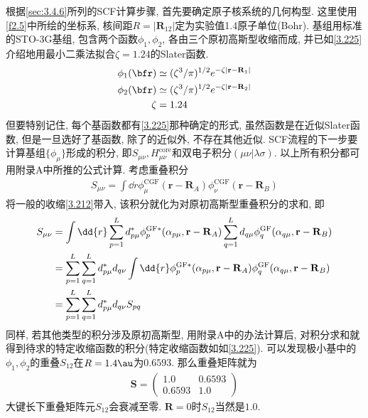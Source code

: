 根据\autoref{sec:3.4.6}所列的SCF计算步骤, 
首先要确定原子核系统的几何构型. 
这里使用\autoref{f2.5}中所绘的坐标系, 
核间距$R=|\mathbf{R}_{12}|$定为实验值1.4原子单位(Bohr). 
基组用标准的STO-3G基组, 
包含两个函数$\phi_1,\phi_2$, 
各由三个原初高斯型收缩而成, 
并已如\autoref{3.225}介绍地用最小二乘法拟合$\zeta=1.24$的Slater函数. 
\begin{equation}
	\begin{split}
		\phi_1(\bfr) & \simeq (\zeta^3/\pi)^{1/2}e^{-\zeta|\mathbf{r-R}_1|}\\
		\phi_2(\bfr) & \simeq (\zeta^3/\pi)^{1/2}e^{-\zeta|\mathbf{r-R}_2|}\\
		\zeta & = 1.24
	\end{split}
\end{equation}
但要特别记住,
每个基函数都有\autoref{3.225}那种确定的形式, 
虽然函数是在近似Slater函数, 
但是一旦选好了基函数, 
除了\hft 的近似外, 
不存在其他近似. 
SCF流程的下一步要计算基组$\{\phi_\mu\}$形成的积分, 
即$S_{\mu\nu}, H_{\mu\nu}^\mathrm{core}$和双电子积分$(\mu\nu|\lambda\sigma)$. 
以上所有积分都可用附录A中所推的公式计算. 
考虑重叠积分
\begin{align}
	S_{\mu\nu} = \int\dd{r}\phi_\mu^\mathrm{CGF}(\mathbf{r-R}_A)\phi_\nu^\mathrm{CGF}(\mathbf{r-R}_B)
\end{align}
将一般的收缩\autoref{3.212}带入, 
该积分就化为对原初高斯型重叠积分的求和,
即
\begin{align}
	S_{\mu\nu} & = \int\dd{r}\sum_{p=1}^{L}d_{p\mu}^*\phi_p^\mathrm{GF*}(\alpha_{p\mu},\mathbf{r-R}_A)\sum_{q=1}^{L}d_{q\mu}\phi_q^\mathrm{GF}(\alpha_{q\mu},\mathbf{r-R}_B)\notag\\
	& = \sum_{p=1}^{L}\sum_{q=1}^{L} d_{p\mu}^*d_{q\nu}\int\dd{r}\phi_p^\mathrm{GF*}(\alpha_{p\mu},\mathbf{r-R}_A)\phi_q^\mathrm{GF}(\alpha_{q\mu},\mathbf{r-R}_B)\notag\\
	& = \sum_{p=1}^{L}\sum_{q=1}^{L}d^*_{p\mu}d_{q\nu}S_{pq}
\end{align}
同样, 
若其他类型的积分涉及原初高斯型, 
用附录A中的办法计算后, 
对积分求和就得到待求的特定收缩函数的积分(特定收缩函数如如\autoref{3.225}). 
可以发现极小基中的$\phi_1,\phi_2$的重叠$S_{12}$在$R=1.4\au$为$0.6593$. 
那么重叠矩阵就为
\begin{align}
	\label{3.229}
	\mathbf{S} = 
	\begin{pmatrix}
		1.0 & 0.6593\\0.6593 & 1.0
	\end{pmatrix}
\end{align}
大键长下重叠矩阵元$S_{12}$会衰减至零. 
$\mathbf{R}=0$时$S_{12}$当然是$1.0$.

